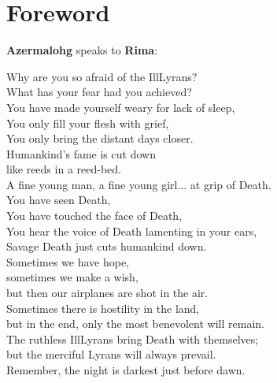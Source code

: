 \documentclass[12pt,a4paper]{memoir}
\theoremstyle{definition}
\begin{document}
\section*{Foreword}
\textbf{Azermalohg} speaks to \textbf{Rima}:
\begin{displayquote}
	Why are you so afraid of the IllLyrans?\\
	What has your fear had you achieved?\\
	You have made yourself weary for lack of sleep,\\
	You only fill your flesh with grief,\\
	You only bring the distant days closer.\\
	Humankind's fame is cut down\\
	like reeds in a reed-bed.\\
	A fine young man, a fine young girl... at grip of Death.\\
	You have seen Death,\\
	You have touched the face of Death,\\
	You hear the voice of Death lamenting in your ears,\\
	Savage Death just cuts humankind down.\\
	Sometimes we have hope,\\
	sometimes we make a wish,\\
	but then our airplanes are shot in the air.\\
	Sometimes there is hostility in the land,\\
	but in the end, only the most benevolent will remain.\\
	The ruthless IllLyrans bring Death with themselves;\\
	but the merciful Lyrans will always prevail.\\
	Remember, the night is darkest just before dawn.
\end{displayquote}


\newpage
\end{document}
